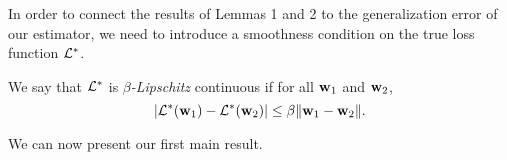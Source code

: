 \documentclass[thesis.tex]{subfiles}
\begin{document}
In order to connect the results of Lemmas 1 and 2 to the generalization error of our estimator,
we need to introduce a smoothness condition on the true loss function $\mathcal{L}^*$.
\begin{definition}
    We say that $\mathcal{L}^*$ is \emph{$\beta$-Lipschitz} continuous if for all $\mathbf w_1$ and $\mathbf w_2$,
    \begin{equation}
    |\mathcal{L}^*(\mathbf w_1)-\mathcal{L}^*(\mathbf w_2)|\le\beta{\lVert {\mathbf w_1-\mathbf w_2} \rVert}.
    \end{equation}
\end{definition}
We can now present our first main result.
\end{document}
